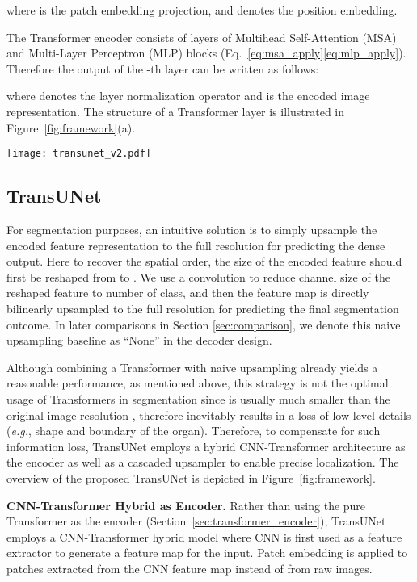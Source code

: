 \documentclass[runningheads]{llncs}
\begin{document}
\noindent where  is the patch embedding projection, and  denotes the position embedding. 


The Transformer encoder consists of  layers of Multihead Self-Attention (MSA) and Multi-Layer Perceptron (MLP) blocks (Eq.~\eqref{eq:msa_apply}\eqref{eq:mlp_apply}). Therefore the output of the -th layer can be written as follows:

where  denotes the layer normalization operator and  is the encoded image representation. The structure of a Transformer layer is illustrated in Figure~\ref{fig:framework}(a).


\begin{figure*}[t!]
    \centering
    \texttt{[image: transunet\_v2.pdf]}
    \caption{Overview of the framework. (a) schematic of the Transformer layer; (b) architecture of the proposed TransUNet.
    }
    \label{fig:framework}
\end{figure*}

\subsection{TransUNet}
\label{sec:transunet}
For segmentation purposes, an intuitive solution is to simply upsample the encoded feature representation  to the full resolution for predicting the dense output.
Here to recover the spatial order, the size of the encoded feature should first be reshaped from   to .
We use a   convolution to reduce channel size of the reshaped feature to number of class, and then the feature map is directly bilinearly upsampled to the full resolution  for predicting the final segmentation outcome. In later comparisons in Section \ref{sec:comparison}, we denote this naive upsampling baseline as ``None'' in the decoder design. 

Although combining a Transformer with naive upsampling already yields a reasonable performance, as mentioned above, this strategy is not the optimal usage of Transformers in segmentation since  is usually much smaller than the original image resolution , therefore inevitably results in a loss of low-level details (\emph{e.g.}, shape and boundary of the organ).
Therefore, to compensate for such information loss, TransUNet employs a hybrid CNN-Transformer architecture as the encoder as well as a cascaded upsampler to enable precise localization. The overview of the proposed TransUNet is depicted in Figure~\ref{fig:framework}.


\vspace{1ex}\noindent\textbf{CNN-Transformer Hybrid as Encoder.}
Rather than using the pure Transformer as the encoder (Section~\ref{sec:transformer_encoder}), TransUNet employs a  CNN-Transformer hybrid model where CNN is first used as a feature extractor to generate a feature map for the input. Patch embedding is applied to  patches extracted from the CNN feature map instead of from raw images. 
\end{document}
